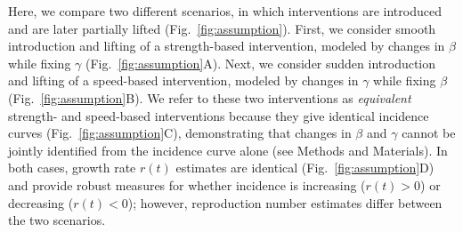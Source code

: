 \documentclass[12pt]{article}
\newcommand{\fref}[1]{Fig.~\ref{fig:#1}}
\begin{document}
Here, we compare two different scenarios, in which interventions are introduced and are later partially lifted (\fref{assumption}).
First, we consider smooth introduction and lifting of a strength-based intervention, modeled by changes in $\beta$ while fixing $\gamma$ (\fref{assumption}A).
Next, we consider sudden introduction and lifting of a speed-based intervention, modeled by changes in $\gamma$ while fixing $\beta$ (\fref{assumption}B).
We refer to these two interventions as \emph{equivalent} strength- and speed-based interventions because they give identical incidence curves (\fref{assumption}C), demonstrating that changes in $\beta$ and $\gamma$ cannot be jointly identified from the incidence curve alone (see Methods and Materials).
In both cases, growth rate $r(t)$ estimates are identical (\fref{assumption}D) and provide robust measures for whether incidence is increasing ($r(t) > 0$) or decreasing ($r(t) < 0$); however, reproduction number estimates differ between the two scenarios.
\end{document}
